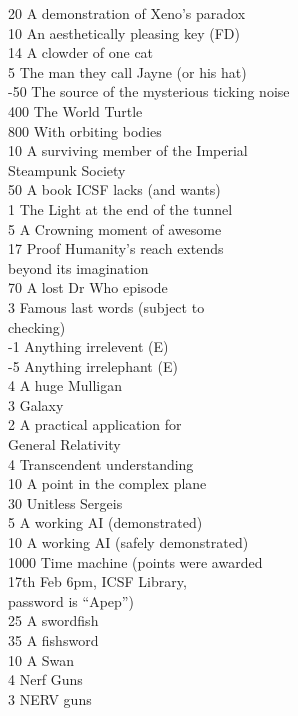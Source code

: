 \begin{multicols}{2}
\begin{tabbing}
20 	\> A demonstration of Xeno's paradox \\
10  \> An aesthetically pleasing key (FD)\\
14 	\> A clowder of one cat \\
5   \> The man they call Jayne (or his hat) \\
-50 \> The source of the mysterious ticking noise \\
400	\> The World Turtle \\
800 \> With orbiting bodies \\
10  \> A surviving member of the Imperial \\ \> Steampunk Society \\
50	\> A book ICSF lacks (and wants) \\
1	\> The Light at the end of the tunnel \\
5	\> A Crowning moment of awesome \\
17	\> Proof Humanity’s reach extends \\ \> beyond its imagination \\
70  \> A lost Dr Who episode \\
3	\> Famous last words (subject to \\ \> checking) \\
-1	\> Anything irrelevent (E) \\
-5  \> Anything irrelephant (E) \\
4   \> A huge Mulligan \\
3	\> Galaxy \\
2	\> A practical application for \\ \> General Relativity \\
4	\> Transcendent understanding \\
10	\> A point in the complex plane \\
30	 Unitless Sergeis \\
5   \> A working AI (demonstrated) \\
10  \> A working AI (safely demonstrated) \\
1000	\> Time machine (points were awarded \\ \> 17th Feb 6pm, ICSF Library, \\ \> password is ``Apep'') \\
25	\> A swordfish \\
35	\> A fishsword \\
10	\> A Swan \\
4	\> Nerf Guns \\
3	\> NERV guns \\

\end{tabbing}
\end{multicols}
